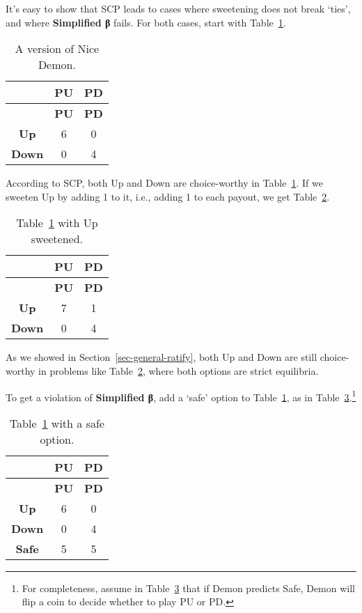 \documentclass[
  10pt,
  letterpaper,
  DIV=11,
  numbers=noendperiod,
  twoside]{scrartcl}
\begin{document}
It's easy to show that SCP leads to cases where sweetening does not
break `ties', and where \textbf{Simplified β} fails. For both cases,
start with Table~\ref{tbl-nice-demon-linear}.

\begin{longtable}[]{@{}ccc@{}}
\caption{A version of Nice
Demon.}\label{tbl-nice-demon-linear}\tabularnewline
\toprule\noalign{}
& \textbf{PU} & \textbf{PD} \\
\midrule\noalign{}
\endfirsthead
\toprule\noalign{}
& \textbf{PU} & \textbf{PD} \\
\midrule\noalign{}
\endhead
\bottomrule\noalign{}
\endlastfoot
\textbf{Up} & 6 & 0 \\
\textbf{Down} & 0 & 4 \\
\end{longtable}

According to SCP, both Up and Down are choice-worthy in
Table~\ref{tbl-nice-demon-linear}. If we sweeten Up by adding 1 to it,
i.e., adding 1 to each payout, we get Table~\ref{tbl-nice-demon-plus}.

\begin{longtable}[]{@{}ccc@{}}
\caption{Table~\ref{tbl-nice-demon-linear} with Up
sweetened.}\label{tbl-nice-demon-plus}\tabularnewline
\toprule\noalign{}
& \textbf{PU} & \textbf{PD} \\
\midrule\noalign{}
\endfirsthead
\toprule\noalign{}
& \textbf{PU} & \textbf{PD} \\
\midrule\noalign{}
\endhead
\bottomrule\noalign{}
\endlastfoot
\textbf{Up} & 7 & 1 \\
\textbf{Down} & 0 & 4 \\
\end{longtable}

As we showed in Section~\ref{sec-general-ratify}, both Up and Down are
still choice-worthy in problems like Table~\ref{tbl-nice-demon-plus},
where both options are strict equilibria.

To get a violation of \textbf{Simplified β}, add a `safe' option to
Table~\ref{tbl-nice-demon-linear}, as in
Table~\ref{tbl-nice-demon-safe}.\footnote{For completeness, assume in
  Table~\ref{tbl-nice-demon-safe} that if Demon predicts Safe, Demon
  will flip a coin to decide whether to play PU or PD.}

\begin{longtable}[]{@{}ccc@{}}
\caption{Table~\ref{tbl-nice-demon-linear} with a safe
option.}\label{tbl-nice-demon-safe}\tabularnewline
\toprule\noalign{}
& \textbf{PU} & \textbf{PD} \\
\midrule\noalign{}
\endfirsthead
\toprule\noalign{}
& \textbf{PU} & \textbf{PD} \\
\midrule\noalign{}
\endhead
\bottomrule\noalign{}
\endlastfoot
\textbf{Up} & 6 & 0 \\
\textbf{Down} & 0 & 4 \\
\textbf{Safe} & 5 & 5 \\
\end{longtable}
\end{document}
